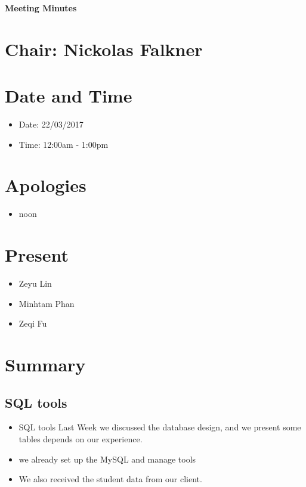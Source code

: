 \documentclass[11pt, a4paper]{article}
\begin{document}
\vspace*{15pt}
\begin{center}
\huge \bf Meeting Minutes
\end{center}

\section*{Chair: Nickolas Falkner}

\vspace*{10pt}

\section{Date and Time}
\begin{itemize}
\item Date: 22/03/2017
\item Time: 12:00am - 1:00pm
\end{itemize}

\section{Apologies}
\begin{itemize}
\item noon
\end{itemize}

\section{Present}
\begin{itemize}
\item Zeyu Lin
\item Minhtam Phan
\item Zeqi Fu
\end{itemize}



\section{Summary }
\subsection{SQL tools}

\begin{itemize}
\item SQL tools
Last Week we discussed the database design, and we present some tables depends on our experience.
\item we already set up the MySQL and manage tools
\item We also received the student data from our client.
\end{itemize}
\end{document}
